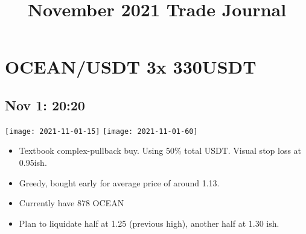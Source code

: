 \documentclass{../notes}
\title{November 2021 Trade Journal}
\begin{document}
\maketitle

\section{OCEAN/USDT 3x 330USDT}
\subsection{Nov 1: 20:20}
\texttt{[image: 2021-11-01-15]}
\texttt{[image: 2021-11-01-60]}
\begin{itemize}
  \item Textbook complex-pullback buy. Using 50\% total USDT. Visual stop loss at 0.95ish.
  \item Greedy, bought early for average price of around 1.13.
  \item Currently have 878 OCEAN
  \item Plan to liquidate half at 1.25 (previous high), another half at 1.30 ish.
\end{itemize}
\end{document}
